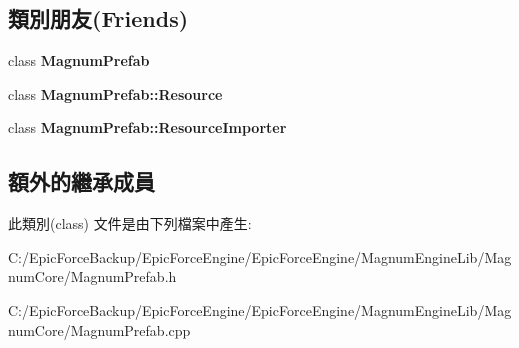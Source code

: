 \subsection*{類別朋友(Friends)}
\begin{DoxyCompactItemize}
\item 
class {\bfseries Magnum\+Prefab}\hypertarget{class_magnum_1_1_magnum_prefab_1_1_resource_importer_af673f35827b6a2ca5306beed6f132f97}{}\label{class_magnum_1_1_magnum_prefab_1_1_resource_importer_af673f35827b6a2ca5306beed6f132f97}

\item 
class {\bfseries Magnum\+Prefab\+::\+Resource}\hypertarget{class_magnum_1_1_magnum_prefab_1_1_resource_importer_a96406f0ce756fc948a514e9f70ce0305}{}\label{class_magnum_1_1_magnum_prefab_1_1_resource_importer_a96406f0ce756fc948a514e9f70ce0305}

\item 
class {\bfseries Magnum\+Prefab\+::\+Resource\+Importer}\hypertarget{class_magnum_1_1_magnum_prefab_1_1_resource_importer_a4eb47515c2ca88e47be1dcbb51810ba6}{}\label{class_magnum_1_1_magnum_prefab_1_1_resource_importer_a4eb47515c2ca88e47be1dcbb51810ba6}

\end{DoxyCompactItemize}
\subsection*{額外的繼承成員}


此類別(class) 文件是由下列檔案中產生\+:\begin{DoxyCompactItemize}
\item 
C\+:/\+Epic\+Force\+Backup/\+Epic\+Force\+Engine/\+Epic\+Force\+Engine/\+Magnum\+Engine\+Lib/\+Magnum\+Core/Magnum\+Prefab.\+h\item 
C\+:/\+Epic\+Force\+Backup/\+Epic\+Force\+Engine/\+Epic\+Force\+Engine/\+Magnum\+Engine\+Lib/\+Magnum\+Core/Magnum\+Prefab.\+cpp\end{DoxyCompactItemize}
